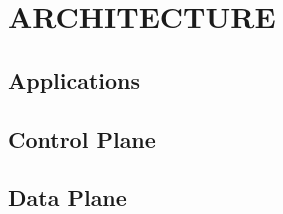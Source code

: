 \chapter{ARCHITECTURE}
\label{arch}

\section{Applications}
\label{arch:apps}

\section{Control Plane}
\label{arch:control-plane}

\section{Data Plane}
\label{arch:data-plane}
